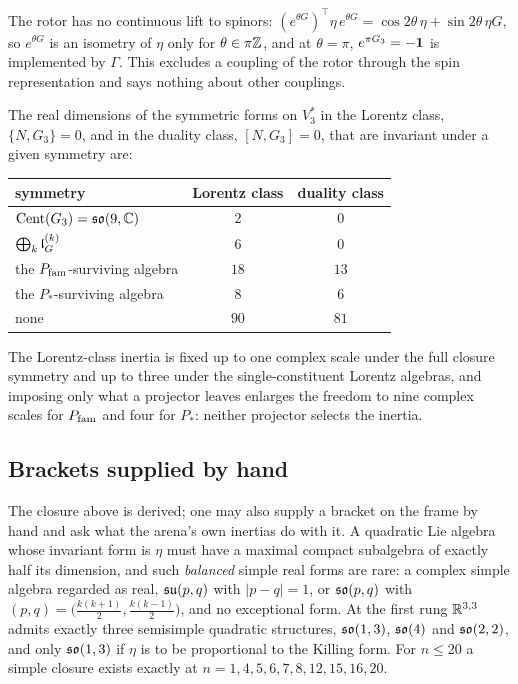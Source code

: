 The rotor has no continuous lift to spinors: $(e^{\theta G})^{\!\top}\eta\,e^{\theta G}=\cos2\theta\,\eta+\sin2\theta\,\eta G$, so $e^{\theta G}$ is an isometry of
$\eta$ only for $\theta\in\pi\mathbb{Z}$, and at $\theta=\pi$, $e^{\pi G_3}=-\mathbf 1$ is implemented by $\Gamma$. This excludes a coupling of the rotor through the
spin representation and says nothing about other couplings.

\begin{theorem}
\label{thm:inertia3}
The real dimensions of the symmetric forms on $V_3^*$ in the Lorentz class, $\{N,G_3\}=0$, and in the duality class, $[N,G_3]=0$, that are invariant
under a given symmetry are:
\begin{center}
\begin{tabular}{@{}lcc@{}}
\toprule
symmetry & Lorentz class & duality class\\
\midrule
$\operatorname{Cent}(G_3)=\mathfrak{so}(9,\mathbb{C})$ & $2$ & $0$\\
$\bigoplus_k\mathfrak l_G^{(k)}$ & $6$ & $0$\\
the $P_{\rm fam}$-surviving algebra & $18$ & $13$\\
the $P_*$-surviving algebra & $8$ & $6$\\
none & $90$ & $81$\\
\bottomrule
\end{tabular}
\end{center}
\end{theorem}

The Lorentz-class inertia is fixed up to one complex scale under the full closure symmetry and up to three under the single-constituent Lorentz
algebras, and imposing only what a projector leaves enlarges the freedom to nine complex scales for $P_{\rm fam}$ and four for $P_*$: neither projector
selects the inertia.

\subsection{Brackets supplied by hand}

The closure above is derived; one may also supply a bracket on the frame by hand and ask what the arena's own inertias do with it. A quadratic Lie
algebra whose invariant form is $\eta$ must have a maximal compact subalgebra of exactly half its dimension, and such \emph{balanced} simple real forms
are rare: a complex simple algebra regarded as real, $\mathfrak{su}(p,q)$ with $|p-q|=1$, or $\mathfrak{so}(p,q)$ with $(p,q)=\bigl(\tfrac{k(k+1)}2,\tfrac{k(k-1)}2\bigr)$, and
no exceptional form. At the first rung $\mathbb{R}^{3,3}$ admits exactly three semisimple quadratic structures, $\mathfrak{so}(1,3)$, $\mathfrak{so}(4)$ and $\mathfrak{so}(2,2)$, and only
$\mathfrak{so}(1,3)$ if $\eta$ is to be proportional to the Killing form. For $n\le20$ a simple closure exists exactly at $n=1,4,5,6,7,8,12,15,16,20$.

